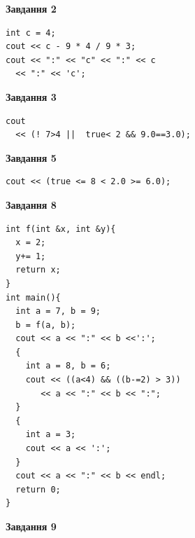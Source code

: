 \documentclass[12pt, ukrainian]{article}
\begin{document}
{\begin {large}
\begin{minipage}[t]{7.0cm}
\end{minipage}
\vline \hspace{1mm}
\begin{minipage}[t]{11.0cm}

\begin{center}
\textbf{Завдання 2}
\end{center}
\vspace{-8mm}

\begin{verbatim}
int c = 4;
cout << c - 9 * 4 / 9 * 3;
cout << ":" << "c" << ":" << c 
  << ":" << 'c';
\end{verbatim}



\begin{center}
\textbf{Завдання 3}
\end{center}
\vspace{-8mm}

\begin{verbatim}
cout 
  << (! 7>4 ||  true< 2 && 9.0==3.0);
\end{verbatim}



\begin{center}
\textbf{Завдання 5}
\end{center}
\vspace{-8mm}

\begin{verbatim}
cout << (true <= 8 < 2.0 >= 6.0);
\end{verbatim}



\begin{center}
\textbf{Завдання 8}
\end{center}
\vspace{-8mm}

\begin{verbatim}
int f(int &x, int &y){
  x = 2;
  y+= 1;
  return x;
}
int main(){
  int a = 7, b = 9;
  b = f(a, b);
  cout << a << ":" << b <<':';
  {
    int a = 8, b = 6;
    cout << ((a<4) && ((b-=2) > 3))
       << a << ":" << b << ":";
  }
  {
    int a = 3;
    cout << a << ':';
  }
  cout << a << ":" << b << endl;
  return 0;
}
\end{verbatim}

\end{minipage}


\begin{minipage}[t]{7.0cm}

\begin{center}
\textbf{Завдання 9}
\end{center}
\vspace{-8mm}


\end{minipage}
\end{large}}
\end{document}
